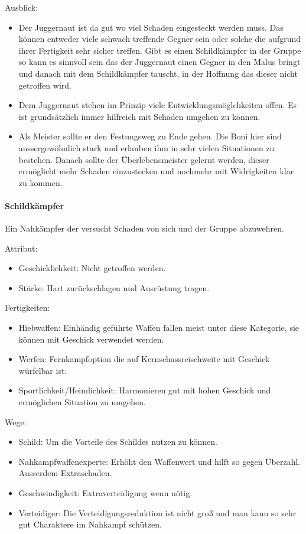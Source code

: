 \documentclass{article}
\begin{document}
Ausblick:
\begin{itemize}
\item Der Juggernaut ist da gut wo viel Schaden eingesteckt werden muss. Das können entweder viele schwach treffende Gegner sein oder solche die aufgrund ihrer Fertigkeit sehr sicher treffen. Gibt es einen Schildkämpfer in der Gruppe so kann es sinnvoll sein das der Juggernaut einen Gegner in den Malus bringt und danach mit dem Schildkämpfer tauscht, in der Hoffnung das dieser nicht getroffen wird.
\item Dem Juggernaut stehen im Prinzip viele Entwicklungsmöglchkeiten offen. Es ist grundsätzlich immer hilfreich mit Schaden umgehen zu können.
\item Als Meister sollte er den Festungsweg zu Ende gehen. Die Boni hier sind aussergewöhnlich stark und erlauben ihm in sehr vielen Situationen zu bestehen. Danach sollte der Überlebensmeister gelernt werden, dieser ermöglicht mehr Schaden einzustecken und nochmehr mit Widrigkeiten klar zu kommen.
\end{itemize}

\paragraph{Schildkämpfer}
Ein Nahkämpfer der versucht Schaden von sich und der Gruppe abzuwehren.

Attribut:
\begin{itemize}
\item Geschicklichkeit: Nicht getroffen werden.
\item Stärke: Hart zurückschlagen und Ausrüstung tragen.
\end{itemize}

Fertigkeiten:
\begin{itemize}
\item Hiebwaffen: Einhändig geführte Waffen fallen meist unter diese Kategorie, sie können mit Geschick verwendet werden.
\item Werfen: Fernkampfoption die auf Kernschussreischweite mit Geschick würfelbar ist.
\item Sportlichkeit/Heimlichkeit: Harmonieren gut mit hohen Geschick und ermöglichen Situation zu umgehen.
\end{itemize}

Wege:
\begin{itemize}
\item Schild: Um die Vorteile des Schildes nutzen zu können.
\item Nahkampfwaffenexperte: Erhöht den Waffenwert und hilft so gegen Überzahl. Ausserdem Extraschaden.
\item Geschwindigkeit: Extraverteidigung wenn nötig.
\item Verteidiger: Die Verteidigungsreduktion ist nicht groß und man kann so sehr gut Charaktere im Nahkampf schützen.
\end{itemize}
\end{document}
